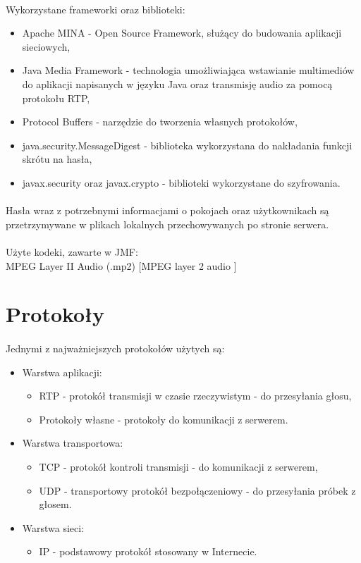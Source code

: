 \documentclass[12pt,a4paper,notitlepage]{report}
\begin{document}
	\paragraph*{} Wykorzystane frameworki oraz biblioteki:
	\begin{itemize}
		\item Apache MINA - Open Source Framework, służący do budowania aplikacji sieciowych,
		\item Java Media Framework - technologia umożliwiająca wstawianie multimediów do aplikacji napisanych w języku Java oraz transmisję audio za pomocą protokołu RTP,
		\item Protocol Buffers - narzędzie do tworzenia własnych protokołów,
		\item java.security.MessageDigest - biblioteka wykorzystana do nakładania funkcji skrótu na hasła,
		\item javax.security oraz javax.crypto - biblioteki wykorzystane do szyfrowania.
	\end{itemize}
	\paragraph*{} Hasła wraz z potrzebnymi informacjami o pokojach oraz użytkownikach są przetrzymywane w plikach lokalnych przechowywanych po stronie serwera.
	\paragraph*{} Użyte kodeki, zawarte w JMF:\\ MPEG Layer II Audio (.mp2) [MPEG layer 2 audio ]
	\section{Protokoły}
	\paragraph*{} Jednymi z najważniejszych protokołów użytych są:
	\begin{itemize}
		\item Warstwa aplikacji:
		\begin{itemize}
			\item RTP - protokół transmisji w czasie rzeczywistym - do przesyłania głosu,
			\item Protokoły własne - protokoły do komunikacji z serwerem.
		\end{itemize}
		\item Warstwa transportowa:
		\begin{itemize}
			\item TCP - protokół kontroli transmisji - do komunikacji z serwerem,
			\item UDP - transportowy protokół bezpołączeniowy - do przesyłania próbek z głosem.
		\end{itemize}
		\item Warstwa sieci:
		\begin{itemize}
			\item IP - podstawowy protokół stosowany w Internecie.
		\end{itemize}
	\end{itemize}
\end{document}
